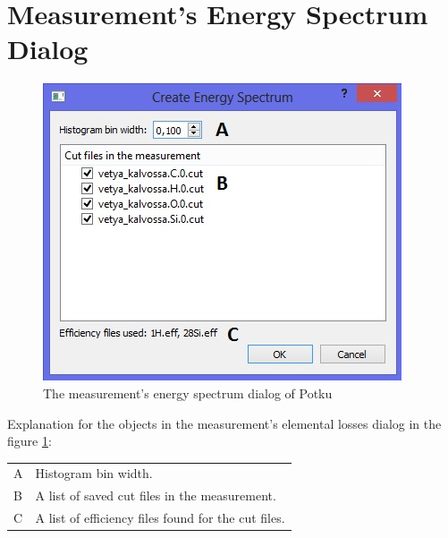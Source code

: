 \documentclass{scrreprt}
\begin{document}
\section{Measurement's Energy Spectrum Dialog}\label{measurement-dialogenergy}
\begin{figure}[H]
\centering
\includegraphics[scale=1]{measurement-dialogenergy}
\caption{The measurement's energy spectrum dialog of Potku}
\label{fig-dialogenergy}
\end{figure}
Explanation for the objects in the measurement's elemental losses dialog in the figure \ref{fig-dialogenergy}:

\begin{tabular}{ll}
A & Histogram bin width.\\
B & A list of saved cut files in the measurement.\\
C & A list of efficiency files found for the cut files.\\
\end{tabular}

\end{document}
